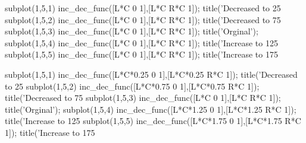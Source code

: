 subplot(1,5,1)
inc_dec_func([L*C 0 1],[L*C R*C 1]);
title('Decreased to 25%
subplot(1,5,2)
inc_dec_func([L*C 0 1],[L*C R*C 1]);
title('Decreased to 75%
subplot(1,5,3)
inc_dec_func([L*C 0 1],[L*C R*C 1]);
title('Orginal');
subplot(1,5,4)
inc_dec_func([L*C 0 1],[L*C R*C 1]);
title('Increase to 125%
subplot(1,5,5)
inc_dec_func([L*C 0 1],[L*C R*C 1]);
title('Increase to 175%



subplot(1,5,1)
inc_dec_func([L*C*0.25 0 1],[L*C*0.25 R*C 1]);
title('Decreased to 25%
subplot(1,5,2)
inc_dec_func([L*C*0.75 0 1],[L*C*0.75 R*C 1]);
title('Decreased to 75%
subplot(1,5,3)
inc_dec_func([L*C 0 1],[L*C R*C 1]);
title('Orginal');
subplot(1,5,4)
inc_dec_func([L*C*1.25 0 1],[L*C*1.25 R*C 1]);
title('Increase to 125%
subplot(1,5,5)
inc_dec_func([L*C*1.75 0 1],[L*C*1.75 R*C 1]);
title('Increase to 175%
